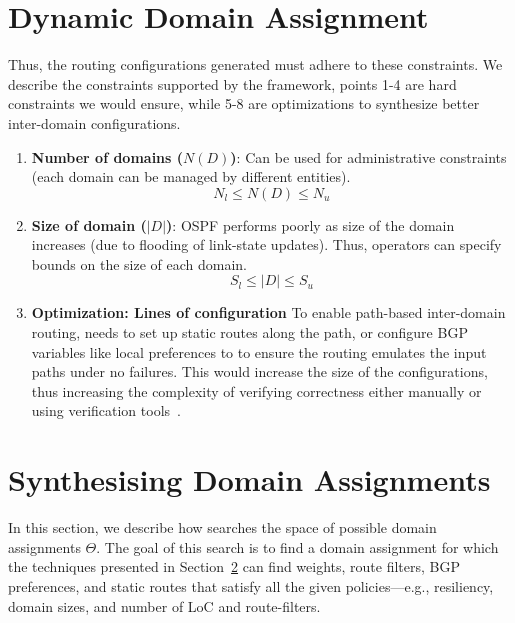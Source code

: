 \section{Dynamic Domain Assignment}
Thus, the routing 
configurations generated must adhere to 
these constraints. We describe the constraints
supported by the framework, points 1-4 are 
hard constraints we would ensure, while 5-8
are optimizations to synthesize better inter-domain
configurations. 

\begin{enumerate}
	\item \textbf{Number of domains ($N(D)$)}: 
	Can be used for administrative constraints 
	(each domain can be managed by different
	entities). 
	\begin{equation}
	N_l \leq N(D) \leq N_u
	\end{equation}

	\item \textbf{Size of domain ($|D|$)}: OSPF
	performs poorly as size of the domain increases
	(due to flooding of link-state updates). Thus,
	operators can specify bounds on the size of each
	domain.
	\begin{equation}
	S_l \leq |D| \leq S_u
	\end{equation}


	\item \textbf{Optimization: Lines of configuration} 
	To enable path-based inter-domain routing, \name needs
	to set up static routes along the path, or configure BGP 
	variables like local preferences to 
	to ensure the routing emulates the input paths under no 
	failures. This would increase the size of the configurations,
	thus increasing the complexity of verifying correctness either 
	manually or using verification tools~\cite{batfish}. 

\end{enumerate}

\section{Synthesising Domain Assignments}
In this section, we describe how \name searches the space of possible
domain assignments $\Theta$.
The goal of this search is to find a domain assignment for which
the techniques presented in Section~\ref{} can find weights, route filters,
BGP preferences, and static routes that satisfy all the given  policies---e.g.,
resiliency, domain sizes, and number of LoC and route-filters.

